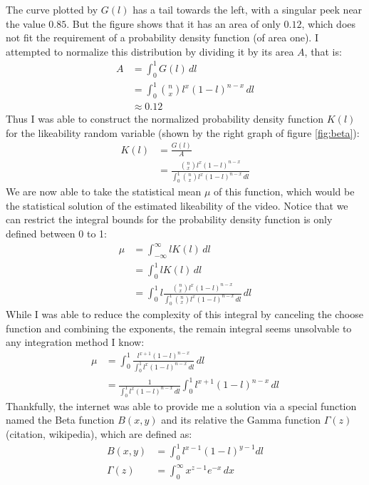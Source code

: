 \documentclass[a4paper,11pt]{article}
\begin{document}
The curve plotted by $G(l)$ has a tail towards the left, with a singular peek near the value $0.85$. But the figure shows that it has an area of only $0.12$, which does not fit the requirement of a probability density function (of area one). I attempted to normalize this distribution by dividing it by its area $A$, that is:
\begin{align*}
    A &= \int_{0}^{1} G(l) \, dl\\
    &= \int_{0}^{1} {n \choose x} l^x (1-l)^{n-x} \, dl\\
    &\approx 0.12
\end{align*}
Thus I was able to construct the normalized probability density function $K(l)$ for the likeability random variable (shown by the right graph of figure \ref{fig:beta}):
\begin{align*}
    K(l) &= \frac{G(l)}{A}\\
    &= \frac{ {n \choose x} l^x (1-l)^{n-x}} {\int_{0}^{1} {n \choose x} l^x (1-l)^{n-x} \, dl}
\end{align*}
We are now able to take the statistical mean $\mu$ of this function, which would be the statistical solution of the estimated likeability of the video. Notice that we can restrict the integral bounds for the probability density function is only defined between 0 to 1:
\begin{align*}
    \mu &= \int_{-\infty}^{\infty} l K(l) \, dl\\
    &=\int_{0}^{1} l K(l) \, dl\\
    &=\int_{0}^{1} l \frac{ {n \choose x} l^x (1-l)^{n-x}} {\int_{0}^{1} {n \choose x} l^x (1-l)^{n-x} \, dl} \, dl
\end{align*}
While I was able to reduce the complexity of this integral by canceling the choose function and combining the exponents, the remain integral seems unsolvable to any integration method I know:
\begin{align*}
    \mu &=\int_{0}^{1} \frac{ l^{x+1} (1-l)^{n-x}} {\int_{0}^{1} l^x (1-l)^{n-x} \, dl} \, dl\\
    &= \frac{1}{\int_{0}^{1} l^x (1-l)^{n-x} \, dl} \int_{0}^{1}  l^{x+1} (1-l)^{n-x} \, dl
\end{align*}
Thankfully, the internet was able to provide me a solution via a special function named the Beta function $B(x,y)$ and its relative the Gamma function $\Gamma(z)$(citation, wikipedia), which are defined as:
\begin{align*}
    B(x, y) &= \int_{0}^{1} l^{x-1} (1-l)^{y-1} dl\\
    \Gamma(z) &= \int_{0}^{\infty} x^{z-1} e^{-x} \, dx
\end{align*}
\end{document}
